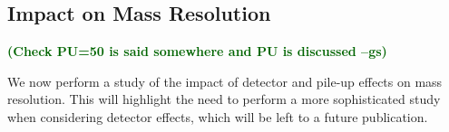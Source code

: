 \documentclass[11pt]{cernrep}
\newcommand{\gs}[1]{\textbf{\textcolor{darkgreen}{(#1 --gs)}}}
\begin{document}
% 

\subsection{Impact on Mass Resolution}\label{jetsub_2prong_sec:detector_robust}

\gs{Check PU=50 is said somewhere and PU is discussed}

We now perform a study of the impact of detector and pile-up effects on mass resolution.
%
This will highlight the need to perform a more sophisticated study when considering detector effects, which will be left to a future publication.
\end{document}
